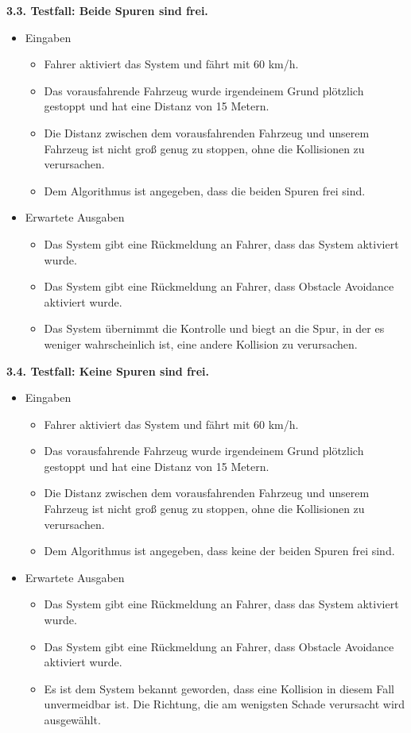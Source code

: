\textbf{3.3. Testfall: Beide Spuren sind frei.}
\begin{itemize}
	\item Eingaben
	\begin{itemize}
		\item Fahrer aktiviert das System und fährt mit 60 km/h.
		\item Das vorausfahrende Fahrzeug wurde irgendeinem Grund plötzlich gestoppt und hat eine Distanz von 15 Metern.
		\item Die Distanz zwischen dem vorausfahrenden Fahrzeug und unserem Fahrzeug ist nicht groß genug zu stoppen, ohne die Kollisionen zu verursachen.
		\item Dem Algorithmus ist angegeben, dass die beiden Spuren frei sind.
	\end{itemize}
	\item Erwartete Ausgaben
	\begin{itemize}
		\item Das System gibt eine Rückmeldung an Fahrer, dass das System aktiviert wurde.
		\item Das System gibt eine Rückmeldung an Fahrer, dass Obstacle Avoidance aktiviert wurde.
		\item Das System übernimmt die Kontrolle und biegt an die Spur, in der es weniger wahrscheinlich ist, eine andere Kollision zu verursachen.
	\end{itemize}
\end{itemize}
\textbf{3.4. Testfall: Keine Spuren sind frei.}
\begin{itemize}
	\item Eingaben
	\begin{itemize}
		\item Fahrer aktiviert das System und fährt mit 60 km/h.
		\item Das vorausfahrende Fahrzeug wurde irgendeinem Grund plötzlich gestoppt und hat eine Distanz von 15 Metern.
		\item Die Distanz zwischen dem vorausfahrenden Fahrzeug und unserem Fahrzeug ist nicht groß genug zu stoppen, ohne die Kollisionen zu verursachen.
		\item Dem Algorithmus ist angegeben, dass keine der beiden Spuren frei sind.
	\end{itemize}
	\item Erwartete Ausgaben
	\begin{itemize}
		\item Das System gibt eine Rückmeldung an Fahrer, dass das System aktiviert wurde.
		\item Das System gibt eine Rückmeldung an Fahrer, dass Obstacle Avoidance aktiviert wurde.
		\item Es ist dem System bekannt geworden, dass eine Kollision in diesem Fall unvermeidbar ist. Die Richtung, die am wenigsten Schade verursacht wird ausgewählt.
	\end{itemize}
\end{itemize}
